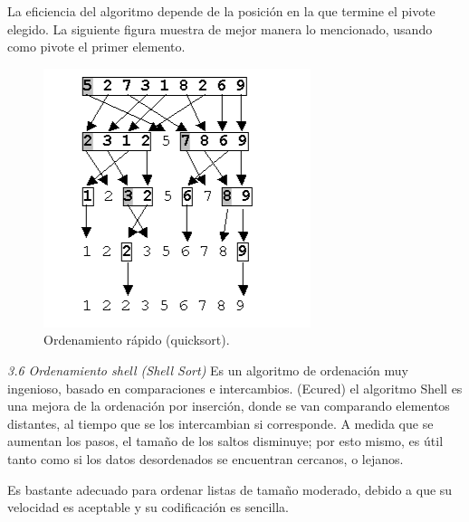 \documentclass[twoside,10.5pt]{article}%
\begin{document}
La eficiencia del algoritmo depende de la posici\'on en la que termine el pivote elegido. La siguiente figura muestra de mejor manera lo mencionado, usando como pivote el primer elemento.


\begin{figure}[h]
   \centering
   \includegraphics[scale=.65]{quicksort.png}
   \caption{Ordenamiento r\'apido (quicksort).} 
  \end{figure}

\newpage


\emph{3.6   Ordenamiento shell  (Shell Sort)}
Es un algoritmo de ordenaci\'on muy ingenioso, basado en comparaciones e intercambios. (Ecured) el algoritmo Shell es una mejora de la ordenaci\'on por inserci\'on, donde se van comparando elementos distantes, al tiempo que se los intercambian si corresponde. A medida que se aumentan los pasos, el tama\~no de los saltos disminuye; por esto mismo, es \'util tanto como si los datos desordenados se encuentran cercanos, o lejanos.

Es bastante adecuado para ordenar listas de tama\~no moderado, debido a que su velocidad es aceptable y su codificaci\'on es  sencilla. 
\end{document}
